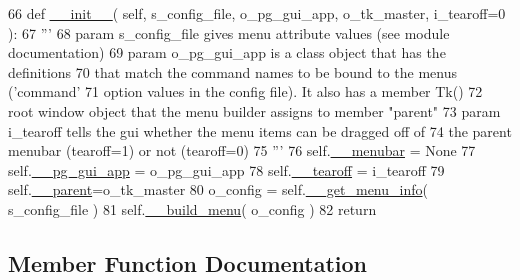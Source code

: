 \begin{DoxyCode}
66     \textcolor{keyword}{def }\hyperlink{classpgmenubuilder_1_1PGMenuBuilder_afc8654886790ae5046fb9e8e476a26f9}{\_\_init\_\_}( self, s\_config\_file, o\_pg\_gui\_app,  o\_tk\_master, i\_tearoff=0 ):
67         \textcolor{stringliteral}{'''}
68 \textcolor{stringliteral}{        param s\_config\_file gives menu attribute values (see module documentation)}
69 \textcolor{stringliteral}{        param o\_pg\_gui\_app is a class object that has the definitions}
70 \textcolor{stringliteral}{                that match the command names to be bound to the menus ('command' }
71 \textcolor{stringliteral}{                option values in the config file). It also has a member Tk()}
72 \textcolor{stringliteral}{                root window object that the menu builder assigns to member "parent"}
73 \textcolor{stringliteral}{        param i\_tearoff tells the gui whether the menu items can be dragged off of }
74 \textcolor{stringliteral}{            the parent menubar (tearoff=1) or not (tearoff=0)}
75 \textcolor{stringliteral}{        '''}
76         self.\hyperlink{classpgmenubuilder_1_1PGMenuBuilder_a6e61d514af10b1f57a9b98b25376f564}{\_\_menubar} = \textcolor{keywordtype}{None}
77         self.\hyperlink{classpgmenubuilder_1_1PGMenuBuilder_a7655c5be3515cd662620e937a549cc3c}{\_\_pg\_gui\_app} = o\_pg\_gui\_app
78         self.\hyperlink{classpgmenubuilder_1_1PGMenuBuilder_a9c3ffefe467e1884190768a2e14cd43d}{\_\_tearoff} = i\_tearoff
79         self.\hyperlink{classpgmenubuilder_1_1PGMenuBuilder_aeafc085214abfe4d18d5ddc1ee7cd2b5}{\_\_parent}=o\_tk\_master
80         o\_config = self.\hyperlink{classpgmenubuilder_1_1PGMenuBuilder_aa8daef118f2830dd8779b402d5a16fbf}{\_\_get\_menu\_info}( s\_config\_file )
81         self.\hyperlink{classpgmenubuilder_1_1PGMenuBuilder_ae0b0fb41c0f8c20f902c8d802a6e8725}{\_\_build\_menu}( o\_config )
82         \textcolor{keywordflow}{return}
\end{DoxyCode}


\subsection{Member Function Documentation}
